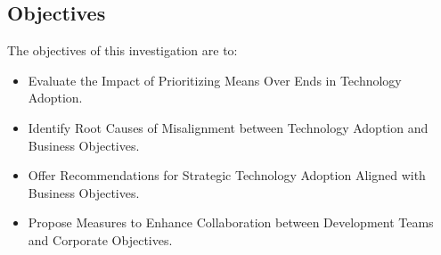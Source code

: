 \documentclass[a4Paper]{article}
\begin{document}
\subsection{Objectives}
The objectives of this investigation are to:
\begin{itemize}
\item Evaluate the Impact of Prioritizing Means Over Ends in Technology Adoption.
\item Identify Root Causes of Misalignment between Technology Adoption and Business Objectives.
\item Offer Recommendations for Strategic Technology Adoption Aligned with Business Objectives.
\item Propose Measures to Enhance Collaboration between Development Teams and Corporate Objectives.
\end{itemize}
\pagebreak

\subsection{}

\pagebreak
%
%
%
\end{document}
